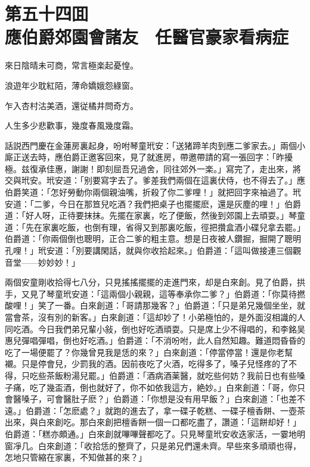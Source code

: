 
\chapter*{第五十四囬　\\應伯爵郊園會諸友　任醫官豪家看病症}


\begin{myquote}
來日陰晴未可商，常言極楽起憂惶。

浪遊年少耽紅陌，薄命嬌娥怨綠窗。

乍入杏村沽美酒，還従橘井問奇方。

人生多少悲歡事，幾度春風幾度霜。
\end{myquote}

話説西門慶在金蓮房裏起身，吩咐琴童玳安：「送猪蹄羊肉到應二爹家去。」兩個小廝正送去時，應伯爵正邀客回來，見了就進房，帶邀帶請的寫一張回字：「昨擾極。兹復承佳惠，謝謝！即刻屈吾兄過舍，同往郊外一楽。」寫完了，走出來，將交與玳安。玳安道：「别要寫字去了。爹差我們兩個在這裏伏侍，也不得去了。」應伯爵笑道：「怎好勞動你兩個親油嘴，折殺了你二爹哩！」就把回字來袖過了。玳安道：「二爹，今日在那笪兒吃酒？我們把桌子也擺擺麽，還是灰塵的哩！」伯爵道：「好人呀，正待要抹抹。先擺在家裏，吃了便飯，然後到郊園上去頑耍。」琴童道：「先在家裏吃飯，也倒有理，省得又到那裏吃飯，徑把攢盒酒小碟兒拿去罷。」伯爵道：「你兩個倒也聰明，正合二爹的粗主意。想是日夜被人鑽掘，掘開了聰明孔哩！」玳安道：「別要講閑話，就與你收拾起來。」伯爵道：「這叫做接連三個觀音堂——妙妙妙！」

兩個安童剛收拾得七八分，只見搖搖擺擺的走進門來，却是白來創。見了伯爵，拱手，又見了琴童玳安道：「這兩個小親親，這等奉承你二爹？」伯爵道：「你莫待撚酸哩！」笑了一番。白來創道：「哥請那幾客？」伯爵道：「只是弟兄幾個坐坐，就當會茶，沒有別的新客。」白來創道：「這却妙了！小弟極怕的，是外面沒相識的人同吃酒。今日我們弟兄輩小敍，倒也好吃酒頑耍。只是席上少不得唱的，和李銘吴惠兒彈唱彈唱，倒也好吃酒。」伯爵道：「不消吩咐，此人自然知趣。難道悶昏昏的吃了一場便罷了？你幾曾見我是恁的來？」白來創道：「停當停當！還是你老幫襯。只是停會兒，少罰我的酒。因前夜吃了火酒，吃得多了，嗓子兒怪疼的了不得，只吃些茶飯粉湯兒罷。」伯爵道：「酒病酒薬醫，就吃些何妨？我前日也有些嗓子痛，吃了幾盃酒，倒也就好了，你不如依我這方，絶妙。」白來創道：「哥，你只會醫嗓子，可會醫肚子麽？」伯爵道：「你想是没有用早飯？」白來創道：「也差不遠。」伯爵道：「怎麽處？」就跑的進去了，拿一碟子乾糕、一碟子檀香餅、一壺茶出來，與白來創吃。那白來創把檀香餅一個一口都吃盡了，讚道：「這餅却好！」伯爵道：「糕亦頗通。」白來創就嗶嗶聲都吃了。只見琴童玳安收迭家活，一霎地明窗凈几。白來創道：「收拾恁的整齊了，只是弟兄們還未齊。早些來多頑頑也得，怎地只管縮在家裏，不知做甚的來？」

